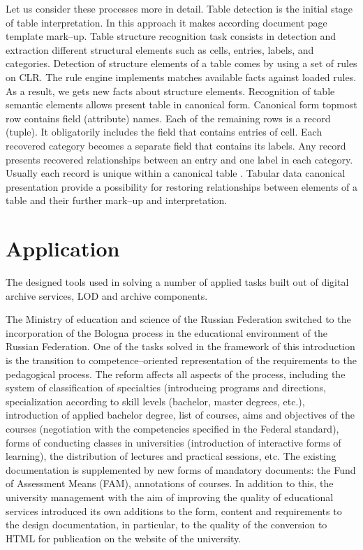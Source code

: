 \documentclass[12pt]{llncs}
\begin{document}
Let us consider these processes more in detail. Table detection is the initial stage of table interpretation. In this approach it makes according document page template mark--up. Table structure recognition task consists in detection and extraction different structural elements such as cells, entries, labels, and categories. Detection of structure elements of a table comes by using a set of rules on CLR. The rule engine implements matches available facts against loaded rules. As a result, we gets new facts about structure elements. Recognition of table semantic elements allows present table in canonical form. Canonical form topmost row contains field (attribute) names. Each of the remaining rows is a record (tuple). It obligatorily includes the field that contains entries of cell. Each recovered category becomes a separate field that contains its labels. Any record presents recovered relationships between an entry and one label in each category. Usually each record is unique within a canonical table \cite{Shigarov_2016}. Tabular data canonical presentation provide a possibility for restoring relationships between elements of a table and their further mark--up and interpretation.

\section{Application}

The designed tools used in solving a number of applied tasks built out
of digital archive services, LOD and archive components.

The Ministry of education and science of the Russian Federation switched to the incorporation of the
Bologna process in the educational environment of the Russian
Federation. One of the tasks solved in the framework of this
introduction is the transition to competence--oriented representation of
the requirements to the pedagogical process. The reform affects all
aspects of the process, including the system of classification of
specialties (introducing programs and directions, specialization
according to skill levels (bachelor, master degrees, etc.), introduction
of applied bachelor degree, list of courses, aims and objectives of the
courses (negotiation with the competencies specified in the Federal
standard), forms of conducting classes in universities (introduction of
interactive forms of learning), the distribution of lectures and
practical sessions, etc. The existing documentation is supplemented by
new forms of mandatory documents: the Fund of Assessment Means (FAM),
annotations of courses. In addition to this, the university management
with the aim of improving the quality of educational services introduced
its own additions to the form, content and requirements to the design
documentation, in particular, to the quality of the conversion to HTML
for publication on the website of the university.
\end{document}
